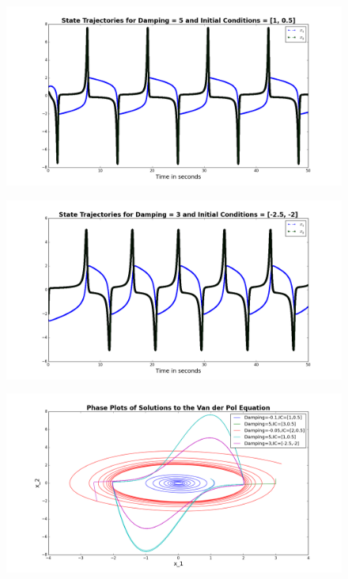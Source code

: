 \documentclass[11pt]{article}
\begin{document}
\begin{figure}[H]
\centering
\includegraphics[scale=0.35]{output/vanderpol_trajectories3}
\end{figure}
\begin{figure}[H]
\centering
\includegraphics[scale=0.35]{output/vanderpol_trajectories4}
\end{figure}
\begin{figure}[H]
\centering
\includegraphics[scale=0.35]{output/vanderpol_equation}
\end{figure}
 
 
\end{document}
